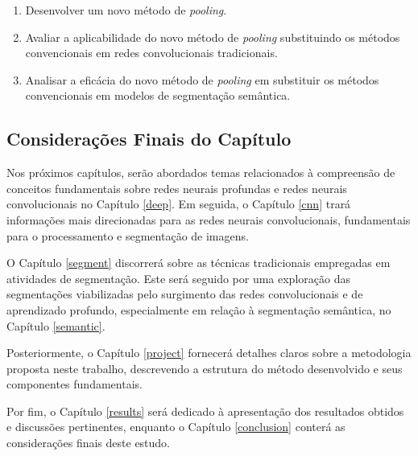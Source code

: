 \begin{enumerate}
    \item Desenvolver um novo método de \textit{pooling}.
    \item Avaliar a aplicabilidade do novo método de \textit{pooling} substituindo os métodos convencionais em redes convolucionais tradicionais.
    \item Analisar a eficácia do novo método de \textit{pooling} em substituir os métodos convencionais em modelos de segmentação semântica.
\end{enumerate}


\subsection{Considerações Finais do Capítulo}
\label{intro:end}
Nos próximos capítulos, serão abordados temas relacionados à compreensão de conceitos fundamentais sobre redes neurais profundas e redes neurais convolucionais no Capítulo \ref{deep}. Em seguida, o Capítulo \ref{cnn} trará informações mais direcionadas para as redes neurais convolucionais, fundamentais para o processamento e segmentação de imagens.

O Capítulo \ref{segment} discorrerá sobre as técnicas tradicionais empregadas em atividades de segmentação. Este será seguido por uma exploração das segmentações viabilizadas pelo surgimento das redes convolucionais e de aprendizado profundo, especialmente em relação à segmentação semântica, no Capítulo \ref{semantic}.

Posteriormente, o Capítulo \ref{project} fornecerá detalhes claros sobre a metodologia proposta neste trabalho, descrevendo a estrutura do método desenvolvido e seus componentes fundamentais.

Por fim, o Capítulo \ref{results} será dedicado à apresentação dos resultados obtidos e discussões pertinentes, enquanto o Capítulo \ref{conclusion} conterá as considerações finais deste estudo.
